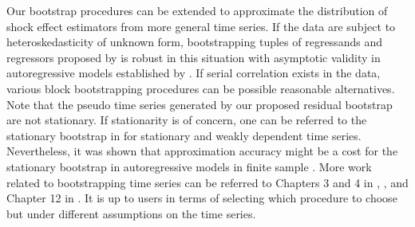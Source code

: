\documentclass[11pt]{article}
\theoremstyle{definition}
\begin{document}
Our bootstrap procedures can be extended to approximate the distribution of shock effect estimators from more general time series. If the data are subject to heteroskedasticity of unknown form, bootstrapping tuples of regressands and regressors proposed by \citet{freedman1981bootstrapping} is robust in this situation with asymptotic validity in autoregressive models established by \citet{gonccalves2004bootstrapping}. If serial correlation exists in the data, various block bootstrapping procedures \citep{kunsch1989jackknife, liu1992moving} can be possible reasonable alternatives. Note that the pseudo time series generated by our proposed residual bootstrap are not stationary. If stationarity is of concern, one can be referred to the stationary bootstrap in \citet{politis1994stationary} for stationary and weakly dependent time series. Nevertheless, it was shown that approximation accuracy might be a cost for the stationary bootstrap in autoregressive  models in finite sample \citep{berkowitz1999finite}.  More work related to bootstrapping time series  can be referred to Chapters 3 and 4 in \citet{politis1999subsampling}, \citet{berkowitz2000recent}, and Chapter 12 in \citet{kilian2017structural}. It is up to  users in terms of selecting which procedure to choose but under different assumptions on the time series.

\end{document}

